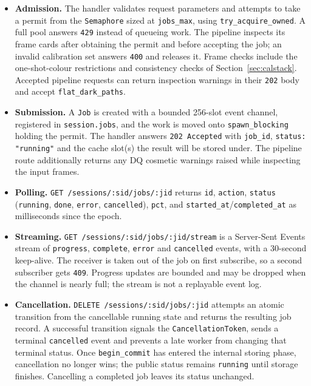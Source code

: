\documentclass[11pt,a4paper]{article}
\newcommand{\code}[1]{\texttt{\small #1}}
\begin{document}
    \begin{itemize}[nosep]
        \item \textbf{Admission.} The handler validates request parameters and attempts to take a permit from the \code{Semaphore} sized at \code{jobs\_max}, using \code{try\_acquire\_owned}. A full pool answers \code{429} instead of queueing work. The pipeline inspects its frame cards after obtaining the permit and before accepting the job; an invalid calibration set answers \code{400} and releases it. Frame checks include the one-shot-colour restrictions and consistency checks of Section~\ref{sec:calstack}. Accepted pipeline requests can return inspection warnings in their \code{202} body and accept \code{flat\_dark\_paths}.
        \item \textbf{Submission.} A \code{Job} is created with a bounded 256-slot event channel, registered in \code{session.jobs}, and the work is moved onto \code{spawn\_blocking} holding the permit. The handler answers \code{202 Accepted} with \code{job\_id}, \code{status: "running"} and the cache slot(s) the result will be stored under. The pipeline route additionally returns any DQ cosmetic warnings raised while inspecting the input frames.
        \item \textbf{Polling.} \code{GET /sessions/:sid/jobs/:jid} returns \code{id}, \code{action}, \code{status} (\code{running}, \code{done}, \code{error}, \code{cancelled}), \code{pct}, and \code{started\_at}/\code{completed\_at} as milliseconds since the epoch.
        \item \textbf{Streaming.} \code{GET /sessions/:sid/jobs/:jid/stream} is a Server-Sent Events stream of \code{progress}, \code{complete}, \code{error} and \code{cancelled} events, with a 30-second keep-alive. The receiver is taken out of the job on first subscribe, so a second subscriber gets \code{409}. Progress updates are bounded and may be dropped when the channel is nearly full; the stream is not a replayable event log.
        \item \textbf{Cancellation.} \code{DELETE /sessions/:sid/jobs/:jid} attempts an atomic transition from the cancellable running state and returns the resulting job record. A successful transition signals the \code{CancellationToken}, sends a terminal \code{cancelled} event and prevents a late worker from changing that terminal status. Once \code{begin\_commit} has entered the internal storing phase, cancellation no longer wins; the public status remains \code{running} until storage finishes. Cancelling a completed job leaves its status unchanged.
    \end{itemize}
\end{document}
